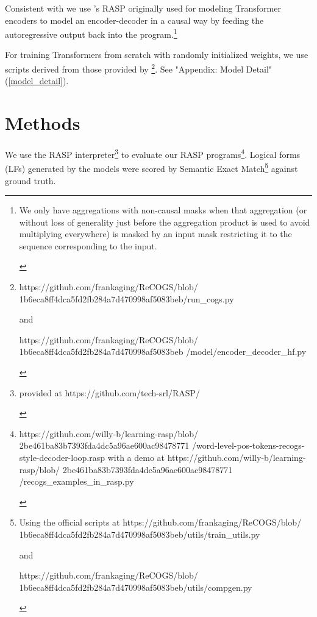 \documentclass[11pt]{article}
\begin{document}
Consistent with \cite{Zhou2024} we use \cite{Weiss2021}'s RASP originally used for modeling Transformer encoders to model an encoder-decoder in a causal way by feeding the autoregressive output back into the program.\footnote{\begin{footnotesize}We only have aggregations with non-causal masks when that aggregation (or without loss of generality just before the aggregation product is used to avoid multiplying everywhere) is masked by an input mask restricting it to the sequence corresponding to the input.\end{footnotesize}}

For training Transformers from scratch with randomly initialized weights, we use scripts derived from those provided by \cite{Wu2023}\footnote{
\begin{footnotesize}https://github.com/frankaging/ReCOGS/blob/
1b6eca8ff4dca5fd2fb284a7d470998af5083beb/run\_cogs.py

and

https://github.com/frankaging/ReCOGS/blob/
1b6eca8ff4dca5fd2fb284a7d470998af5083beb
/model/encoder\_decoder\_hf.py 
\end{footnotesize}
}. See "Appendix: Model Detail" (\ref{model_detail}).
\section{Methods}
We use the RASP \cite{Weiss2021} interpreter\footnote{\begin{footnotesize}provided at https://github.com/tech-srl/RASP/
\end{footnotesize}
} to evaluate our RASP programs\footnote{\begin{footnotesize}https://github.com/willy-b/learning-rasp/blob/
2be461ba83b7393fda4dc5a96ae600ac98478771
/word-level-pos-tokens-recogs-style-decoder-loop.rasp with a demo at https://github.com/willy-b/learning-rasp/blob/
2be461ba83b7393fda4dc5a96ae600ac98478771
/recogs\_examples\_in\_rasp.py  
\end{footnotesize}
}. Logical forms (LFs) generated by the models were scored by Semantic Exact Match\footnote{\begin{footnotesize}Using the official scripts at https://github.com/frankaging/ReCOGS/blob/
1b6eca8ff4dca5fd2fb284a7d470998af5083beb/utils/train\_utils.py

and

https://github.com/frankaging/ReCOGS/blob/
1b6eca8ff4dca5fd2fb284a7d470998af5083beb/utils/compgen.py
\end{footnotesize}
} against ground truth.
\end{document}
